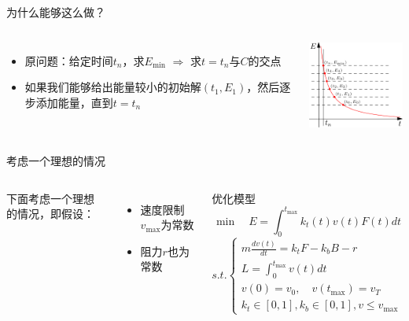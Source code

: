 \documentclass{beamer}
\begin{document}
\begin{frame}{为什么能够这么做？}
    \begin{columns}[c]
        \column{8cm}
            \begin{itemize}
              \item 原问题：给定时间$t_n$，求$E_{\min}$ $\Longrightarrow$ 求$t = t_n$与$C$的交点
              \item 如果我们能够给出能量较小的初始解$(t_1,E_1)$，然后逐步添加能量，直到$t = t_n$
            \end{itemize}
        \column{5cm}\includegraphics[width=4.5cm]{fig/fig3/fig3.pdf}
    \end{columns}
\end{frame}

\begin{frame}{考虑一个理想的情况}
\begin{columns}[c]
    \column{5cm}
        下面考虑一个理想的情况，即假设：
        \begin{itemize}
          \item 速度限制$v_{\max}$为常数
          \item 阻力$r$也为常数
        \end{itemize}
    \column{6cm}
    \begin{block}{优化模型}
        \begin{equation*}
          \min \quad E = \int_0^{t_{\max}} k_t(t) v(t) F(t) dt
        \end{equation*}
        \begin{equation*}
          s.t. \left\{
          \begin{array}{l}
            m \frac{dv(t)}{dt} = k_t F - k_b B - r \\
            L = \int_0^{t_{\max}} v(t) dt \\
            v(0) = v_0, \quad v(t_{\max}) = v_T \\
            k_t \in [0, 1], k_b \in [0,1], v \leq v_{\max}
          \end{array}
          \right.
        \end{equation*}
    \end{block}
\end{columns}
\end{frame}
\end{document}
